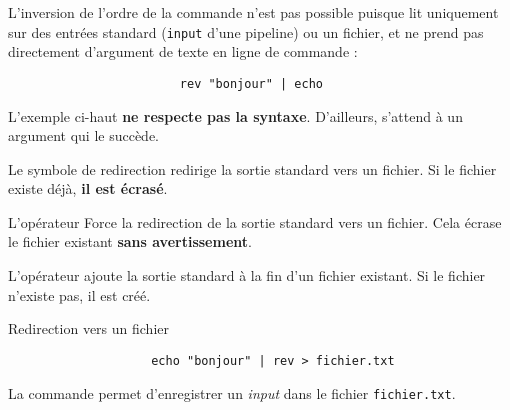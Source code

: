 \documentclass[a4paper, 14pt]{report}
\begin{document}
    \begin{Note}[Directionnalité]
        L'inversion de l'ordre de la commande n'est pas possible puisque 
         lit uniquement 
        sur des entrées standard (\texttt{input} d'une pipeline) ou un fichier, et ne prend pas 
        directement d'argument de texte en ligne de commande : 
        \begin{center}
            \begin{verbatim}
                        rev "bonjour" | echo
            \end{verbatim}
        \end{center}
        L'exemple ci-haut \textbf{ne respecte pas la syntaxe}. D'ailleurs,  
         s'attend à un argument qui le succède.
    \end{Note}




    \begin{Concept}
            
        Le symbole de redirection
        \noindent{}  
        redirige la sortie standard vers un fichier. 
        Si le fichier existe déjà, \textbf{il est écrasé}.
        \vspace{0.5em}

        L'opérateur \noindent{}  
        Force la redirection de la sortie standard vers un fichier. 
        Cela écrase le fichier existant \textbf{sans avertissement}.

        \vspace{0.5em}

        L'opérateur \noindent{}  
        ajoute la sortie standard à la fin d'un fichier existant. Si le fichier 
        n'existe pas, il est créé. 
    \end{Concept}

    \begin{Exemple}{Redirection vers un fichier}{}
        \begin{verbatim}
                    echo "bonjour" | rev > fichier.txt
        \end{verbatim}
        La commande  permet d'enregistrer 
        un \textit{input} dans le fichier \texttt{fichier.txt}.   
    \end{Exemple}
\end{document}
